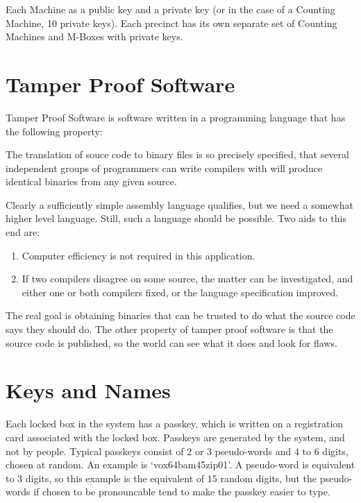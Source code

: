 \documentclass[12pt]{article}
\newenvironment{indpar}[1][0.3in]%
	{\begin{list}{}%
		     {\setlength{\itemsep}{0in}%
		      \setlength{\topsep}{0in}%
		      \setlength{\parsep}{1ex}%
		      \setlength{\labelwidth}{#1}%
		      \setlength{\leftmargin}{#1}%
		      \addtolength{\leftmargin}{\labelsep}}%
	 \item}%
	{\end{list}}
\begin{document}
Each Machine as a public key and a private key (or in the
case of a Counting Machine, 10 private keys).  Each precinct
has its own separate set of Counting Machines and M-Boxes with
private keys.

\section{Tamper Proof Software}

Tamper Proof Software is software written in a programming language
that has the following property:
\begin{indpar}
The translation of souce code to binary files is so precisely
specified, that several independent groups of programmers can
write compilers with will produce identical binaries from any
given source.
\end{indpar}

Clearly a sufficiently simple assembly language qualifies, but
we need a somewhat higher level language.  Still, such a language
should be possible.  Two aids to this end are:
\begin{enumerate}
\item
Computer efficiency is not required in this application.

\item
If two compilers disagree on some source, the matter can be
investigated, and either one or both compilers fixed, or the
language specification improved.
\end{enumerate}

The real goal is obtaining binaries that can be trusted to
do what the source code says they should do.  The other
property of tamper proof software is that the source code
is published, so the world can see what it does and look
for flaws.

\section{Keys and Names}

Each locked box in the system has a passkey, which is
written on a registration card associated with the locked
box.  Passkeys are generated by the system, and not by
people.  Typical passkeys consist of 2 or 3 pseudo-words
and 4 to 6 digits, chosen at random.  An example is
`vox64bam45zip01'.  A pseudo-word is equivalent to 3
digits, so this example is the equivalent of 15 random
digits, but the pseudo-words if chosen to be pronouncable
tend to make the passkey easier to type.
\end{document}

